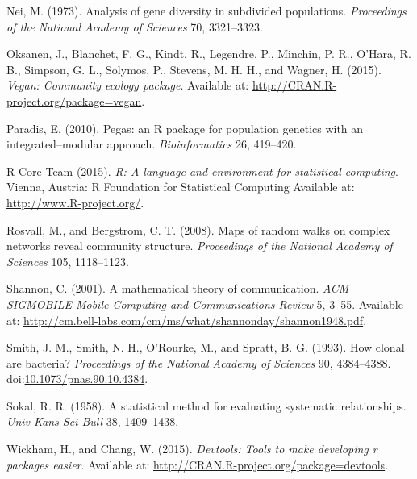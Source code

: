 \documentclass{frontiersSCNS} %
\begin{document}
Nei, M. (1973). Analysis of gene diversity in subdivided populations.
\emph{Proceedings of the National Academy of Sciences} 70, 3321--3323.

Oksanen, J., Blanchet, F. G., Kindt, R., Legendre, P., Minchin, P. R.,
O'Hara, R. B., Simpson, G. L., Solymos, P., Stevens, M. H. H., and
Wagner, H. (2015). \emph{Vegan: Community ecology package}. Available
at: \url{http://CRAN.R-project.org/package=vegan}.

Paradis, E. (2010). Pegas: an R package for population genetics with an
integrated--modular approach. \emph{Bioinformatics} 26, 419--420.

R Core Team (2015). \emph{R: A language and environment for statistical
computing}. Vienna, Austria: R Foundation for Statistical Computing
Available at: \url{http://www.R-project.org/}.

Rosvall, M., and Bergstrom, C. T. (2008). Maps of random walks on
complex networks reveal community structure. \emph{Proceedings of the
National Academy of Sciences} 105, 1118--1123.

Shannon, C. (2001). A mathematical theory of communication. \emph{ACM
SIGMOBILE Mobile Computing and Communications Review} 5, 3--55.
Available at:
\url{http://cm.bell-labs.com/cm/ms/what/shannonday/shannon1948.pdf}.

Smith, J. M., Smith, N. H., O'Rourke, M., and Spratt, B. G. (1993). How
clonal are bacteria? \emph{Proceedings of the National Academy of
Sciences} 90, 4384--4388.
doi:\href{http://dx.doi.org/10.1073/pnas.90.10.4384}{10.1073/pnas.90.10.4384}.

Sokal, R. R. (1958). A statistical method for evaluating systematic
relationships. \emph{Univ Kans Sci Bull} 38, 1409--1438.

Wickham, H., and Chang, W. (2015). \emph{Devtools: Tools to make
developing r packages easier}. Available at:
\url{http://CRAN.R-project.org/package=devtools}.
\end{document}
